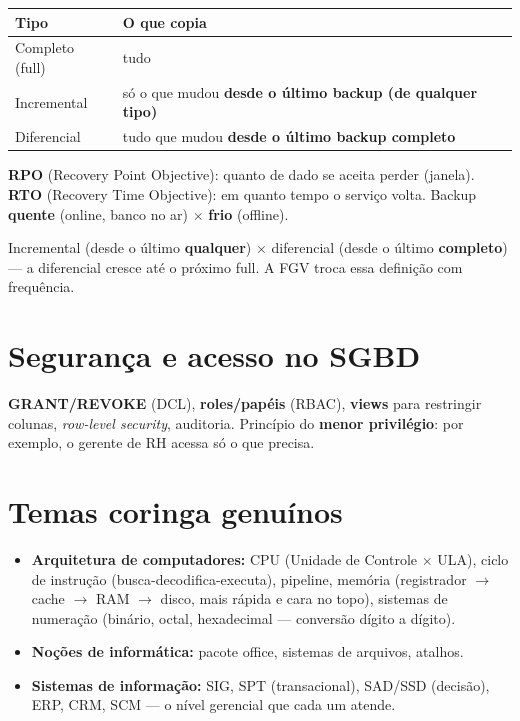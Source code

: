 \begin{center}
\begin{tabular}{@{}p{2.6cm}p{8.4cm}@{}}
\toprule
\textbf{Tipo} & \textbf{O que copia} \\
\midrule
Completo (full) & tudo \\
Incremental & só o que mudou \textbf{desde o último backup (de qualquer tipo)} \\
Diferencial & tudo que mudou \textbf{desde o último backup completo} \\
\bottomrule
\end{tabular}
\end{center}

\textbf{RPO} (Recovery Point Objective): quanto de dado se aceita perder
(janela). \textbf{RTO} (Recovery Time Objective): em quanto tempo o serviço
volta. Backup \textbf{quente} (online, banco no ar) $\times$ \textbf{frio}
(offline).

\begin{pegadinha}
Incremental (desde o último \textbf{qualquer}) $\times$ diferencial (desde o
último \textbf{completo}) --- a diferencial cresce até o próximo full. A FGV
troca essa definição com frequência.
\end{pegadinha}

\section{Segurança e acesso no SGBD}

\textbf{GRANT/REVOKE} (DCL), \textbf{roles/papéis} (RBAC), \textbf{views}
para restringir colunas, \textit{row-level security}, auditoria. Princípio do
\textbf{menor privilégio}: por exemplo, o gerente de RH acessa só o que
precisa.

\section{Temas coringa genuínos}

\begin{itemize}
\item \textbf{Arquitetura de computadores:} CPU (Unidade de Controle
$\times$ ULA), ciclo de instrução (busca-decodifica-executa), pipeline,
memória (registrador $\to$ cache $\to$ RAM $\to$ disco, mais rápida e cara no
topo), sistemas de numeração (binário, octal, hexadecimal --- conversão dígito
a dígito).
\item \textbf{Noções de informática:} pacote office, sistemas de arquivos,
atalhos.
\item \textbf{Sistemas de informação:} SIG, SPT (transacional), SAD/SSD
(decisão), ERP, CRM, SCM --- o nível gerencial que cada um atende.
\end{itemize}

